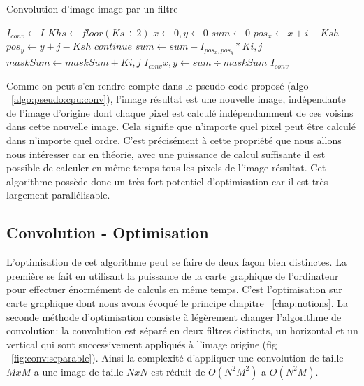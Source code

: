 \begin{algorithm}[H]
	\caption{Convolution d'image image par un filtre}
	\begin{algorithmic}
		\State $I_{conv} \gets I$
		\State $Khs \gets floor(Ks \div 2)$
		\State $x \gets 0, y \gets 0$
		\State $sum \gets 0$
					\State ${pos_x \gets x + i - Ksh}$ 
					\State ${pos_y \gets y + j - Ksh}$ 
					 
						\State $continue$
					\EndIf
					\State $sum \gets sum + I_{pos_x, pos_y} * K{i, j}$ 
					\State $maskSum \gets maskSum + K{i, j}$
					\EndFor
				\EndFor
				\State $I_{conv}{x, y} \gets sum \div maskSum$ 
			\EndFor
		\EndFor
		\State \Return $I_{conv}$ 
		\EndProcedure
	\end{algorithmic}
	\label{algo:pseudo:cpu:conv}
\end{algorithm}

Comme on peut s'en rendre compte dans le pseudo code proposé (algo ~\ref{algo:pseudo:cpu:conv}), l'image résultat est une nouvelle image, indépendante de l'image d'origine dont chaque pixel est calculé indépendamment de ces voisins dans cette nouvelle image. Cela signifie que n'importe quel pixel peut être calculé dans n'importe quel ordre. C'est précisément à cette propriété que nous allons nous intéresser car en théorie, avec une puissance de calcul suffisante il est possible de calculer en même temps tous les pixels de l'image résultat. Cet algorithme possède donc un très fort potentiel d'optimisation car il est très largement parallélisable.

\subsection{Convolution - Optimisation}
L'optimisation de cet algorithme peut se faire de deux façon bien distinctes. La première se fait en utilisant la puissance de la carte graphique de l'ordinateur pour effectuer énormément de calculs en même temps. C'est l'optimisation sur carte graphique dont nous avons évoqué le principe chapitre ~\ref{chap:notions}. La seconde méthode d'optimisation consiste à légèrement changer l'algorithme de convolution: la convolution est séparé en deux filtres distincts\cite{podlozhnyuk2007image}, un horizontal et un vertical qui sont successivement appliqués à l'image origine (fig ~\ref{fig:conv:separable}). Ainsi la complexité d'appliquer une convolution de taille $MxM$ a une image de taille $NxN$ est réduit de $O(N^2M^2)$ a $O(N^2M)$.

